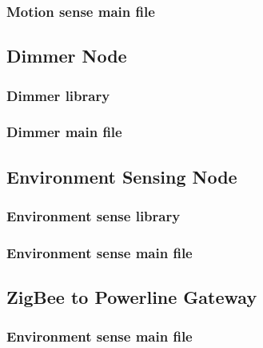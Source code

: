 \subsubsection{Motion sense main file}


\pagebreak

\subsection{Dimmer Node}
\label{an:dimmer-code}

\subsubsection{Dimmer library}



\subsubsection{Dimmer main file}


\pagebreak

\subsection{Environment Sensing Node}
\label{an:environment-code}

\subsubsection{Environment sense library}



\subsubsection{Environment sense main file}


\pagebreak

\subsection{ZigBee to Powerline Gateway}
\label{an:gateway-code}

\subsubsection{Environment sense main file}


\pagebreak




